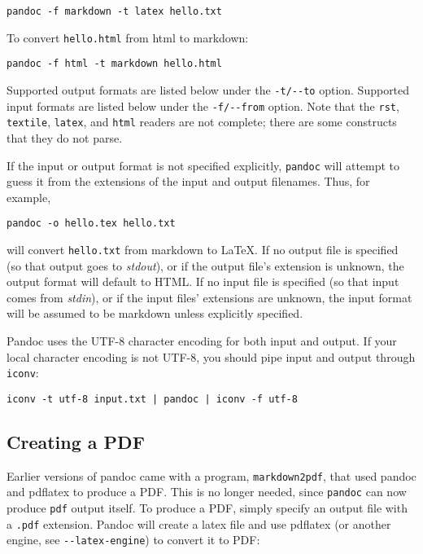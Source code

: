 \documentclass[]{article}
\begin{document}
\begin{verbatim}
pandoc -f markdown -t latex hello.txt
\end{verbatim}

To convert \texttt{hello.html} from html to markdown:

\begin{verbatim}
pandoc -f html -t markdown hello.html
\end{verbatim}

Supported output formats are listed below under the \texttt{-t/-{}-to}
option. Supported input formats are listed below under the
\texttt{-f/-{}-from} option. Note that the \texttt{rst},
\texttt{textile}, \texttt{latex}, and \texttt{html} readers are not
complete; there are some constructs that they do not parse.

If the input or output format is not specified explicitly,
\texttt{pandoc} will attempt to guess it from the extensions of the
input and output filenames. Thus, for example,

\begin{verbatim}
pandoc -o hello.tex hello.txt
\end{verbatim}

will convert \texttt{hello.txt} from markdown to LaTeX. If no output
file is specified (so that output goes to \emph{stdout}), or if the
output file's extension is unknown, the output format will default to
HTML. If no input file is specified (so that input comes from
\emph{stdin}), or if the input files' extensions are unknown, the input
format will be assumed to be markdown unless explicitly specified.

Pandoc uses the UTF-8 character encoding for both input and output. If
your local character encoding is not UTF-8, you should pipe input and
output through \texttt{iconv}:

\begin{verbatim}
iconv -t utf-8 input.txt | pandoc | iconv -f utf-8
\end{verbatim}

\subsection{Creating a PDF}\label{creating-a-pdf}

Earlier versions of pandoc came with a program, \texttt{markdown2pdf},
that used pandoc and pdflatex to produce a PDF. This is no longer
needed, since \texttt{pandoc} can now produce \texttt{pdf} output
itself. To produce a PDF, simply specify an output file with a
\texttt{.pdf} extension. Pandoc will create a latex file and use
pdflatex (or another engine, see \texttt{-{}-latex-engine}) to convert
it to PDF:
\end{document}
